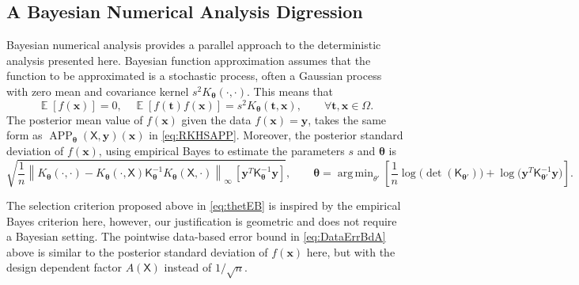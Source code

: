 \documentclass[]{mcom-l}
\theoremstyle{plain}
\theoremstyle{definition}
\DeclareMathOperator*{\argmin}{arg\,min}
\DeclareMathOperator{\APP}{APP}
\DeclareMathOperator{\Ex}{\mathbb{E}}
\newcommand{\mK}{\mathsf{K}}
\newcommand{\mX}{\mathsf{X}}
\newcommand{\bx}{{\boldsymbol{x}}}
\newcommand{\by}{{\boldsymbol{y}}}
\newcommand{\bt}{{\boldsymbol{t}}}
\newcommand{\btheta}{{\boldsymbol{\theta}}}
\newcommand{\cx}{{\Omega}}
\newcommand{\norm}[2][{}]{\ensuremath{\left \lVert #2 \right \rVert}_{#1}}
\begin{document}
\subsection{A Bayesian Numerical Analysis Digression} \label{sec:Bayes}

Bayesian numerical analysis \cite{Dia88a,RasWil06a,Ste99} provides a parallel approach to the deterministic analysis presented here.  Bayesian function approximation assumes that the function to be approximated is a stochastic process, often a Gaussian process with zero mean and covariance kernel $s^2 K_\btheta(\cdot, \cdot)$.  This means that 
\begin{equation*}
\Ex[f(\bx)] = 0, \quad \Ex[f(\bt) f(\bx)] = s^2K_\btheta(\bt,\bx), \qquad \forall \bt, \bx \in \cx.
\end{equation*}
The posterior mean value of $f(\bx)$ given the data $f(\bx) = \by$, takes the same form as $\APP_\btheta(\mX,\by)(\bx)$ in \eqref{eq:RKHSAPP}.  Moreover, the posterior standard deviation of $f(\bx)$, using empirical Bayes to estimate the parameters $s$ and $\btheta$ is \cite{Hic17a,??}
\begin{equation*}
\sqrt{\frac 1n \norm[\infty]{K_\btheta(\cdot,\cdot) - K_\btheta(\cdot,\mX) \mK_\btheta^{-1} K_\btheta(\mX,\cdot)} \, [\by^T \mK_\btheta^{-1} \by] }, \qquad \btheta = \argmin_{\theta'}  \left[\frac 1n \log \bigl( \det(\mK_{\btheta'}) \bigr) + \log \bigl ( \by^T \mK_{\btheta'}^{-1} \by \bigr)\right].
\end{equation*}

The selection criterion proposed above in \eqref{eq:thetEB} is inspired by the empirical Bayes criterion here, however, our justification is geometric and does not require a Bayesian setting.  The pointwise data-based error bound in \eqref{eq:DataErrBdA} above is similar to the posterior standard deviation of $f(\bx)$ here, but with the design dependent factor $A(\mX)$ instead of $1/\sqrt{n}$.






\end{document}
